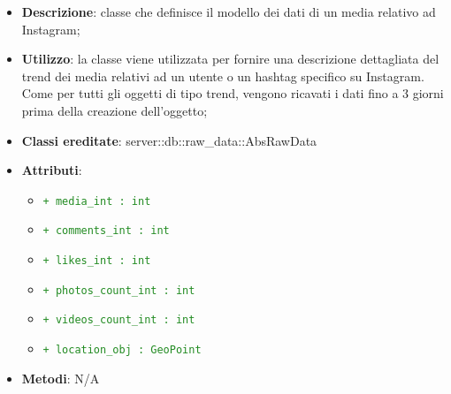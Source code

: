 			\begin{itemize}
				\item \textbf{Descrizione}: classe che definisce il modello dei dati di un media relativo ad Instagram;
				\item \textbf{Utilizzo}: la classe viene utilizzata per fornire una descrizione dettagliata del trend dei media relativi ad un utente o un hashtag specifico su Instagram. Come per tutti gli oggetti di tipo trend, vengono ricavati i dati fino a 3 giorni prima della creazione dell'oggetto;
				\item \textbf{Classi ereditate}: server::db::raw\_data::AbsRawData
				\item \textbf{Attributi}:
					\begin{itemize}
						\item \textcolor{forestgreen}{\texttt{+ media\_int : int}}
						\item \textcolor{forestgreen}{\texttt{+ comments\_int : int}}
						\item \textcolor{forestgreen}{\texttt{+ likes\_int : int}}
						\item \textcolor{forestgreen}{\texttt{+ photos\_count\_int : int}}
						\item \textcolor{forestgreen}{\texttt{+ videos\_count\_int : int}}
						\item \textcolor{forestgreen}{\texttt{+ location\_obj : GeoPoint}}
					\end{itemize}
				\item \textbf{Metodi}: N/A
			\end{itemize}

